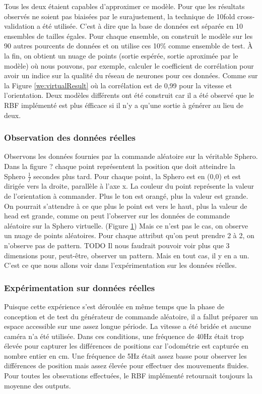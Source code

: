 Tous les deux étaient capables d'approximer ce modèle.
Pour que les résultats observés ne soient pas biaisées par le surajustement, la technique de 10fold cross-validation a été utilisée.
C'est à dire que la base de données est séparée en 10 ensembles de tailles égales.
Pour chaque ensemble, on construit le modèle sur les 90 autres pourcents de données et on utilise ces 10\% comme ensemble de test.
À la fin, on obtient un nuage de points (sortie espérée, sortie aproximée par le modèle) où nous pouvons, par exemple,
calculer le coefficient de corrélation pour avoir un indice sur la qualité du réseau de neurones pour ces données.
Comme sur la Figure \ref{we:virtualResult} où la corrélation est de 0,99 pour la vitesse et l'orientation.
Deux modèles différents ont été construit car il a été observé que le RBF implémenté est plus éfficace si il n'y a qu'une sortie à générer au lieu de deux.

\subsubsection{Observation des données réelles}
\begin{figure}
 \centering
 \label{we:targetvirtual}
\end{figure}

Observons les données fournies par la commande aléatoire sur la véritable Sphero.
Dans la figure ? chaque point représentent la position que doit atteindre la Sphero $\frac{1}{f}$ secondes plus tard.
Pour chaque point, la Sphero est en (0,0) et est dirigée vers la droite, parallèle à l'axe x.
La couleur du point représente la valeur de l'orientation à commander.
Plus le ton est orangé, plus la valeur est grande.
On pourrait s'attendre à ce que plus le point est vers le haut, plus la valeur de head est grande, comme on peut l'observer sur les données de commande aléatoire sur la Sphero virtuelle. (Figure \ref{we:targetvirtual})
Mais ce n'est pas le cas, on observe un nuage de points aléatoires.
Pour chaque attribut qu'on peut prendre 2 à 2, on n'observe pas de pattern. TODO%
Il nous faudrait pouvoir voir plus que 3 dimensions pour, peut-être, observer un pattern.
Mais en tout cas, il y en a un.
C'est ce que nous allons voir dans l'expérimentation sur les données réelles.

\subsubsection{Expérimentation sur données réelles}
Puisque cette expérience s'est déroulée en même temps que la phase de conception et de test du générateur de commande aléatoire,
il a fallut préparer un espace accessible sur une assez longue période.
La vitesse a été bridée et aucune caméra n'a été utilisée.
Dans ces conditions, une fréquence de 40Hz était trop élevée pour capturer les différences de positions car l'odométrie est capturée en nombre entier en cm.
Une fréquence de 5Hz était assez basse pour observer les différences de position mais assez élevée pour effectuer des mouvements fluides.
Pour toutes les obsevations effectuées, le RBF implémenté retournait toujours la moyenne des outputs.


